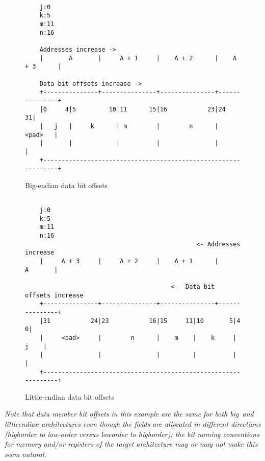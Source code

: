 \begin{figure}[h]
\begin{dwflisting}
\begin{verbatim}

    j:0
    k:5
    m:11
    n:16

    Addresses increase ->
    |       A       |     A + 1     |    A + 2      |    A + 3      | 

    Data bit offsets increase ->
    +---------------+---------------+---------------+---------------+
    |0     4|5         10|11      15|16           23|24           31|
    |   j   |     k      | m        |        n      |       <pad>   |
    |       |            |          |               |               | 
    +---------------------------------------------------------------+ 

\end{verbatim}
\end{dwflisting}
\caption{Big-endian data bit offsets}
\label{fig:bigendiandatabitoffsets}
\end{figure}

\begin{figure}[h]
\begin{dwflisting}
\begin{verbatim}

    j:0
    k:5
    m:11
    n:16
                                               <- Addresses increase
    |     A + 3     |     A + 2     |    A + 1      |       A       | 

                                        <-  Data bit offsets increase 
    +---------------+---------------+---------------+---------------+
    |31           24|23           16|15     11|10       5|4        0|
    |     <pad>     |        n      |    m    |    k     |     j    |
    |               |               |         |          |          |
    +---------------------------------------------------------------+

\end{verbatim}
\end{dwflisting}
\caption{Little-endian data bit offsets}
\label{fig:littleendiandatabitoffsets}
\end{figure}

\textit{Note that data member bit offsets in this example are the
same for both big\dash\ and little\dash endian architectures even
though the fields are allocated in different directions
(high\dash order to low-order versus low\dash order to high\dash order);
the bit naming conventions for memory and/or registers of
the target architecture may or may not make this seem natural.}

